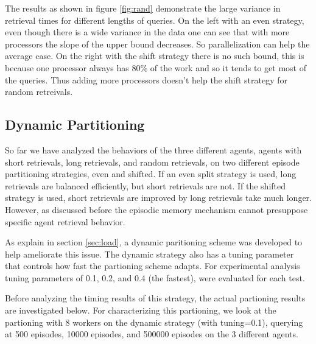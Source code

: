 \documentclass[11pt]{article} %
\begin{document}
The results as shown in figure \ref{fig:rand} demonstrate the large variance in retrieval times for different lengths of queries.
On the left with an even strategy, even though there is a wide variance in the data one can see that with more processors the slope of the upper bound
decreases. So parallelization can help the average case. On the right with the shift strategy there is no such bound, 
this is because one processor always has $80\%$ of the work and so it tends to get most of the queries. Thus
adding more processors doesn't help the shift strategy for random retreivals. 



\subsection{Dynamic Partitioning}

So far we have analyzed the behaviors of the three different agents, agents with short retrievals, long retrievals, and random retrievals, on two different episode partitioning strategies, even and shifted.  If an even split strategy is used, long retrievals are balanced efficiently, but short retrievals are not.  If the shifted strategy is used, short retrievals are improved by long retrievals take much longer. However, as discussed before the episodic memory mechanism cannot presuppose specific agent retrieval behavior.

As explain in section \ref{sec:load}, a dynamic paritioning scheme was developed to help ameliorate this issue.  The dynamic strategy also has a tuning parameter that controls how fast the partioning scheme adapts.  For experimental analysis tuning parameters of 0.1, 0.2, and 0.4 (the fastest), were evaluated for each test.

Before analyzing the timing results of this strategy, the actual partioning results are investigated below.  For characterizing this partioning, we look at the partioning with 8 workers on the dynamic strategy (with tuning=0.1), querying at 500 episodes, 10000 episodes, and 500000 episodes on the 3 different agents.
 
\end{document}
